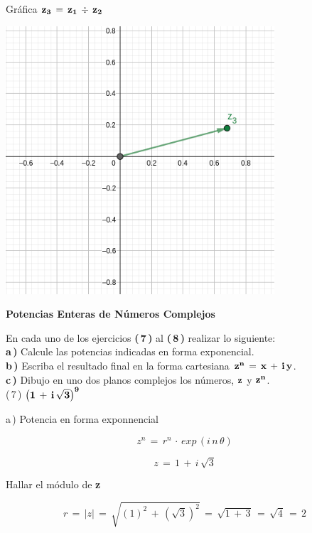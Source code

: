 \documentclass[a4paper,11pt,openany]{book}
\begin{document}
\textcolor{ao(english)}{} Gráfica $\bf{z_{3}\,=\,z_{1}\,\div\,z_{2}}$

\begin{center}
    \includegraphics[width=10cm]{Gra-Ej-6-2.png}
\end{center}

\begin{center}
\textbf{Potencias Enteras de Números Complejos}
\end{center}

En cada uno de los ejercicios \textbf{(\,7\,)} al \textbf{(\,8\,)} realizar lo siguiente:\\

\textbf{a\,)} Calcule las potencias indicadas en forma exponencial.\\

\textbf{b\,)} Escriba el resultado final en la forma cartesiana $\bf{z^{n}\,=\,x\,+\,i\,y}$.\\

\textbf{c\,)} Dibujo en uno dos planos complejos los números, $\bf{z}$ y $\bf{z^{n}}$.\\

\textcolor{ao(english)}{(\,7\,)} $\bf{\left(1\,+\,i\,\sqrt{3}\right)^{9}}$

\textcolor{ao(english)}{a\,)} Potencia en forma exponnencial

$$z^{n}\,=\,r^{n}\,\cdot\,exp\,(i\,n\,\theta)$$

$$z\,=\,1\,+\,i\,\sqrt{3}$$

\textcolor{ao(english)}{} Hallar el módulo de \textbf{z}

$$r\,=\,|z|\,=\,\sqrt{(1)^{2}\,+\,\left(\sqrt{3}\right)^{2}}\,=\,\sqrt{1\,+\,3}\,=\,\sqrt{4}\,=\,2$$
\end{document}
